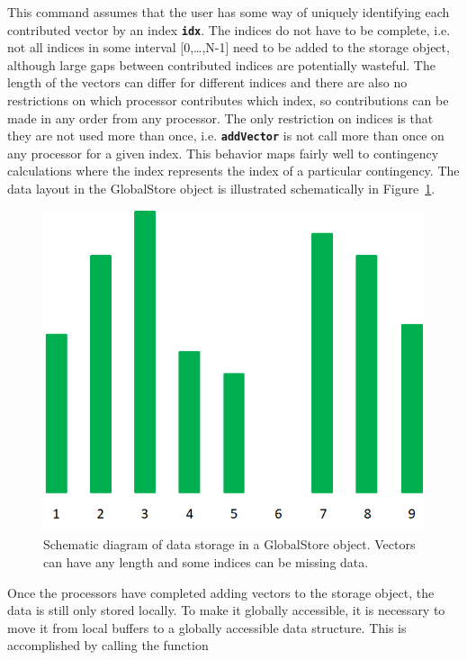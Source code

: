 This command assumes that the user has some way of uniquely identifying each
contributed vector by an index \texttt{\textbf{idx}}. The indices do not have to
be complete, i.e. not all indices in some interval [0,{\dots},N-1] need to be
added to the storage object, although large gaps between contributed indices are
potentially wasteful. The length of the vectors can differ for different indices
and there are also no restrictions on which processor contributes which index,
so contributions can be made in any order from any processor. The only
restriction on indices is that they are not used more than once, i.e.
\texttt{\textbf{addVector}} is not call more than once on any processor for a
given index. This behavior maps fairly well to contingency calculations where
the index represents the index of a particular contingency. The data layout in
the GlobalStore object is illustrated schematically in
Figure~\ref{fig:global-store}.

\begin{figure}
  \centering
    \includegraphics*[width=6.5in, height=3.72in, keepaspectratio=true]{figures/Global-store}
  \caption{Schematic diagram of data storage in a GlobalStore object. Vectors can have any length and some indices can be missing data.}
  \label{fig:global-store}
\end{figure}



Once the processors have completed adding vectors to the storage object, the data is still only stored locally. To make it globally accessible, it is necessary to move it from local buffers to a globally accessible data structure. This is accomplished by calling the function

